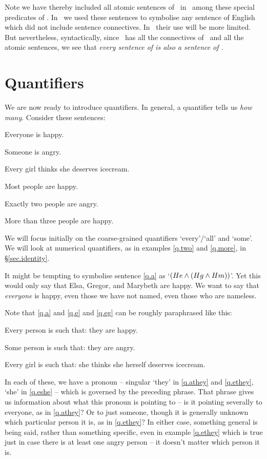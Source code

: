 Note we have thereby included all atomic sentences of \TFL\ in \FOL\ among these special predicates of \FOL. In \TFL\ we used these sentences to symbolise any sentence of English which did not include sentence connectives. In \FOL\ their use will be more limited. But nevertheless, syntactically, since \FOL\ has all the connectives of \TFL\ and all the atomic sentences, we see that \emph{every sentence of \textnormal{\TFL} is also a sentence of \textnormal{\FOL}}.

\section{Quantifiers}\label{quant.pron}
We are now ready to introduce quantifiers. In general, a quantifier tells us \emph{how many}. Consider these sentences:
	\begin{earg}
		\item[\ex{q.a}] Everyone is happy.
		\item[\ex{q.e}] Someone is angry.
		\item[\ex{q.eg}] Every girl thinks she deserves icecream.
		\item[\ex{q.most}] Most people are happy.
		\item[\ex{q.two}] Exactly two people are angry.
		\item[\ex{q.more}] More than three people are happy.
	\end{earg}
We will focus initially on the coarse-grained quantifiers `every'/`all' and `some'. We will look at numerical quantifiers, as in examples \ref{q.two} and \ref{q.more}, in §\ref{sec.identity}.

It might be tempting to symbolise sentence \ref{q.a} as `$(He \wedge (Hg \wedge Hm))$'. Yet this would only say that Elsa, Gregor, and Marybeth are happy. We want to say that \emph{everyone} is happy, even those we have not named, even those who are nameless. %


Note that \ref{q.a} and \ref{q.e} and \ref{q.eg} can be roughly paraphrased like this: \begin{earg}
	\item[\ex{q.athey}] Every person is such that: they are happy.
	\item[\ex{q.ethey}] Some person is such that: they are angry.
	\item[\ex{q.eshe}] Every girl is such that: she thinks she herself deserves icecream.
\end{earg} In each of these, we have a pronoun – singular `they' in \ref{q.athey} and \ref{q.ethey}, `she' in \ref{q.eshe} – which is governed by the preceding phrase. That phrase gives us information about what this pronoun is pointing to – is it pointing severally to everyone, as in \ref{q.athey}? Or to just someone, though it is generally unknown which particular person it is, as in \ref{q.ethey}? In either case, something general is being said, rather than something specific, even in example \ref{q.ethey} which is true just in case there is at least one angry person – it doesn't matter which person it is. 

